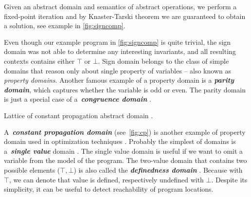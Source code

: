 \prule
\bigskip

Given an abstract domain and semantics of abstract operations, we perform a fixed-point iteration and by Knaster-Tarski
theorem \cite{Tarski1955} we are guaranteed to obtain a solution, see example in
\autoref{fig:signcomp}.

Even though our example program in \autoref{fig:signcomp} is quite trivial, the
sign domain  was not able to determine any interesting invariants,
and all resulting contexts contains either $\top$ or $\bot$.  Sign domain belongs to
the class of simple domains that reason only about single property of variables --
also known as \emph{property domains}. Another famous example of a property
domain is a \textbf{\emph{parity domain}}, which captures whether the
variable is odd or even. The parity domain is just a special case of
a~\textbf{\emph{congruence domain}} \cite{Granger1989, Granger1991}.
\begin{marginfigure}%
    \centering
{}
    \caption{Lattice of constant propagation abstract domain .}
    \label{fig:cp}%
\end{marginfigure}%
A~\textbf{\emph{constant propagation domain}} 
(see~\autoref{fig:cp}) is another example of property domain used in
optimization techniques \cite{Kildall1973}. Probably the simplest of domains is
a~\textbf{\emph{single value}} domain . The single value domain is
useful if we want to omit a variable from the model of the program. The
two-value domain that contains two possible elements ($\top, \bot$) is also
called the \textbf{\emph{definedness domain}} . Because with $\top$,
we can denote that value is defined, respectively undefined with $\bot$.
Despite its simplicity, it can be useful to detect reachability of program
locations.

